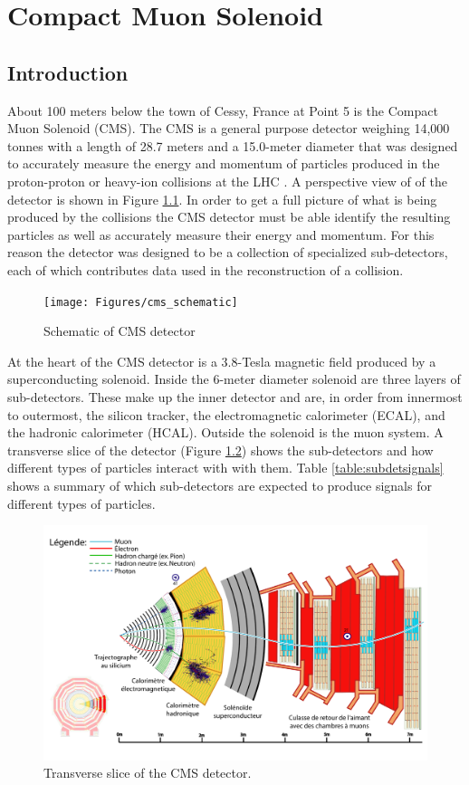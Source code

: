 \chapter{Compact Muon Solenoid}

\section{Introduction}
About 100 meters below the town of Cessy, France at Point 5 is the Compact Muon Solenoid (CMS).  The CMS is a general purpose detector weighing 14,000 tonnes with a length of 28.7 meters and a 15.0-meter diameter that was designed to accurately measure the energy and momentum of particles produced in the proton-proton or heavy-ion collisions at the LHC \cite{Collaboration_2008}.  A perspective view of of the detector is shown in Figure \ref{fig:cmsschematic}.  In order to get a full picture of what is being produced by the collisions the CMS detector must be able identify the resulting particles as well as accurately measure their energy and momentum.  For this reason the detector was designed to be a collection of specialized sub-detectors, each of which contributes data used in the reconstruction of a collision.  
\begin{figure}[h]
	\centering
	\texttt{[image: Figures/cms\_schematic]}
	\caption{Schematic of CMS detector \cite{Sakuma_2014}}
	\label{fig:cmsschematic}
\end{figure}

At the heart of the CMS detector is a 3.8-Tesla magnetic field produced by a superconducting solenoid.  Inside the 6-meter diameter solenoid are three layers of sub-detectors.  These make up the inner detector and are, in order from innermost to outermost, the silicon tracker, the electromagnetic calorimeter (ECAL), and the hadronic calorimeter (HCAL).  Outside the solenoid is the muon system.  A transverse slice of the detector (Figure \ref{fig:cmsslicewhitecolourfrench291016}) shows the sub-detectors and how different types of particles interact with with them.  Table \ref{table:subdetsignals} shows a summary of which sub-detectors are expected to produce signals for different types of particles.

\begin{figure}[h]
	\centering
	\includegraphics[width=0.7\linewidth]{Figures/CMS_slice_white_colour_french_291016}
	\caption{Transverse slice of the CMS detector\cite{Barney:2628641}.}
	\label{fig:cmsslicewhitecolourfrench291016}
\end{figure}



